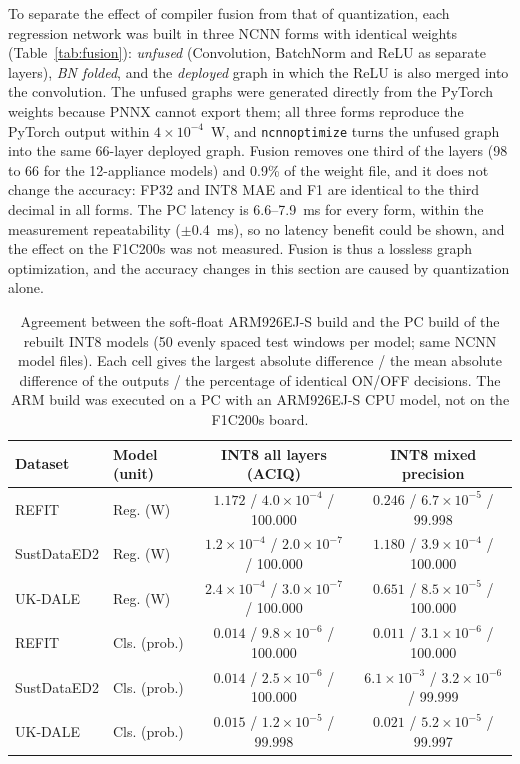 To separate the effect of compiler fusion from that of quantization, each regression network was built in three NCNN forms with identical weights (Table~\ref{tab:fusion}): \textit{unfused} (Convolution, BatchNorm and ReLU as separate layers), \textit{BN folded}, and the \textit{deployed} graph in which the ReLU is also merged into the convolution. The unfused graphs were generated directly from the PyTorch weights because PNNX cannot export them; all three forms reproduce the PyTorch output within $4\times10^{-4}$~W, and \texttt{ncnnoptimize} turns the unfused graph into the same 66-layer deployed graph. Fusion removes one third of the layers (98 to 66 for the 12-appliance models) and 0.9\% of the weight file, and it does not change the accuracy: FP32 and INT8 MAE and F1 are identical to the third decimal in all forms. The PC latency is 6.6--7.9~ms for every form, within the measurement repeatability ($\pm$0.4~ms), so no latency benefit could be shown, and the effect on the F1C200s was not measured. Fusion is thus a lossless graph optimization, and the accuracy changes in this section are caused by quantization alone.

\begin{table}[H]
\centering
\caption{Agreement between the soft-float ARM926EJ-S build and the PC build of the rebuilt INT8 models (50 evenly spaced test windows per model; same NCNN model files). Each cell gives the largest absolute difference / the mean absolute difference of the outputs / the percentage of identical ON/OFF decisions. The ARM build was executed on a PC with an ARM926EJ-S CPU model, not on the F1C200s board.}
\label{tab:arm_build}
\footnotesize
\begin{tabular}{@{}llcc@{}}
\toprule
Dataset & Model (unit) & INT8 all layers (ACIQ) & INT8 mixed precision \\
\midrule
REFIT & Reg. (W) & $1.172$ / $4.0\times10^{-4}$ / 100.000 & $0.246$ / $6.7\times10^{-5}$ / 99.998 \\
SustDataED2 & Reg. (W) & $1.2\times10^{-4}$ / $2.0\times10^{-7}$ / 100.000 & $1.180$ / $3.9\times10^{-4}$ / 100.000 \\
UK-DALE & Reg. (W) & $2.4\times10^{-4}$ / $3.0\times10^{-7}$ / 100.000 & $0.651$ / $8.5\times10^{-5}$ / 100.000 \\
REFIT & Cls. (prob.) & $0.014$ / $9.8\times10^{-6}$ / 100.000 & $0.011$ / $3.1\times10^{-6}$ / 100.000 \\
SustDataED2 & Cls. (prob.) & $0.014$ / $2.5\times10^{-6}$ / 100.000 & $6.1\times10^{-3}$ / $3.2\times10^{-6}$ / 99.999 \\
UK-DALE & Cls. (prob.) & $0.015$ / $1.2\times10^{-5}$ / 99.998 & $0.021$ / $5.2\times10^{-5}$ / 99.997 \\
\bottomrule
\end{tabular}
\end{table}

